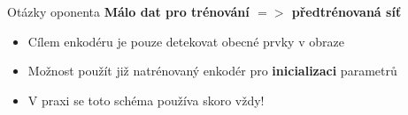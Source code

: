 \documentclass[aspectratio=1610]{beamer}
\begin{document}
\begin{frame}{Otázky oponenta}
\textbf{Málo dat pro trénování $ => $ předtrénovaná síť}
\begin{itemize}
	\item Cílem enkodéru je pouze detekovat obecné prvky v obraze
	\item Možnost použít již natrénovaný enkodér pro \textbf{inicializaci} parametrů
	\item V praxi se toto schéma používa skoro vždy!
\end{itemize}
\end{frame}
\end{document}
